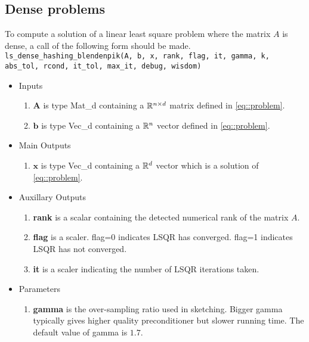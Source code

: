 \documentclass[english,11pt]{article}
\begin{document}
\subsection{Dense problems}

To compute a solution of a linear least square problem where the matrix $A$ is dense, a call of the following form should be made. \\

{\tt ls_dense_hashing_blendenpik(A, b, x, rank, flag, it, gamma, k, abs_tol, rcond, it_tol, max_it, debug, wisdom)}
	\begin{itemize}
	\setlength\itemsep{-0.5em}
	\item Inputs 
		\begin{enumerate}
			\item $\mathbf A$ is type Mat_d containing a $\mathbb{R}^{n \times d}$ matrix defined in \eqref{eq::problem}.
			\item $\mathbf b$ is type Vec_d containing a $\mathbb{R}^n$ vector defined in \eqref{eq::problem}.
		\end{enumerate}
	
	\item Main Outputs
		\begin{enumerate}
			\item { $\mathbf x$} is type Vec_d containing a $\mathbb{R}^d$ vector which is a solution of \eqref{eq::problem}.
		\end{enumerate}

	\item Auxillary Outputs
		\begin{enumerate}
			\item {\bf rank} is a scalar containing the detected numerical rank of the matrix $A$. 
			\item {\bf flag} is a scaler. flag=0 indicates LSQR has converged. flag=1 indicates LSQR has not converged. 
			\item {\bf it} is a scaler indicating the number of LSQR iterations taken. 
		\end{enumerate}
		

	\item Parameters
		\begin{enumerate}
			\item {\bf gamma} is the over-sampling ratio used in sketching. Bigger gamma typically gives higher quality preconditioner but slower running time. The default value of gamma is $1.7$.


\end{enumerate}
\end{itemize}
\end{document}
